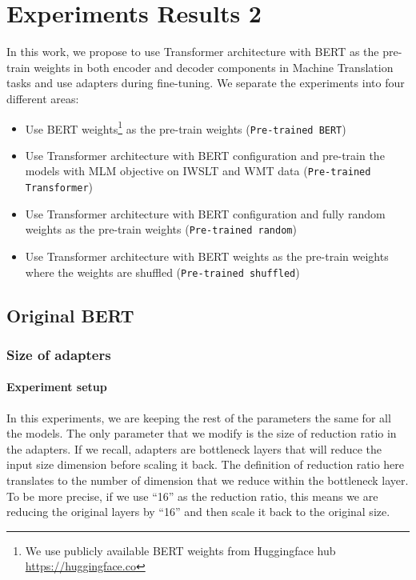
\chapter{Experiments Results 2}
In this work, we propose to use Transformer architecture with BERT as the pre-train weights in both encoder and decoder components in Machine Translation tasks and use adapters during fine-tuning. We separate the experiments into four different areas:
\begin{itemize}
    \item Use BERT weights\footnote{We use publicly available BERT weights from Huggingface hub \url{https://huggingface.co}} as the pre-train weights (\texttt{Pre-trained BERT})
    \item Use Transformer architecture with BERT configuration and pre-train the models with MLM objective on IWSLT and WMT data (\texttt{Pre-trained Transformer})
    \item Use Transformer architecture with BERT configuration and fully random weights as the pre-train weights (\texttt{Pre-trained random})
    \item Use Transformer architecture with BERT weights as the pre-train weights where the weights are shuffled (\texttt{Pre-trained shuffled})
\end{itemize}

\section{Original BERT}
\subsection{Size of adapters}
\subsubsection{Experiment setup}
In this experiments, we are keeping the rest of the parameters the same for all the models. The only parameter that we modify is the size of reduction ratio in the adapters. If we recall, adapters are bottleneck layers that will reduce the input size dimension before scaling it back. The definition of reduction ratio here translates to the number of dimension that we reduce within the bottleneck layer. To be more precise, if we use ``16'' as the reduction ratio, this means we are reducing the original layers by ``16'' and then scale it back to the original size.


